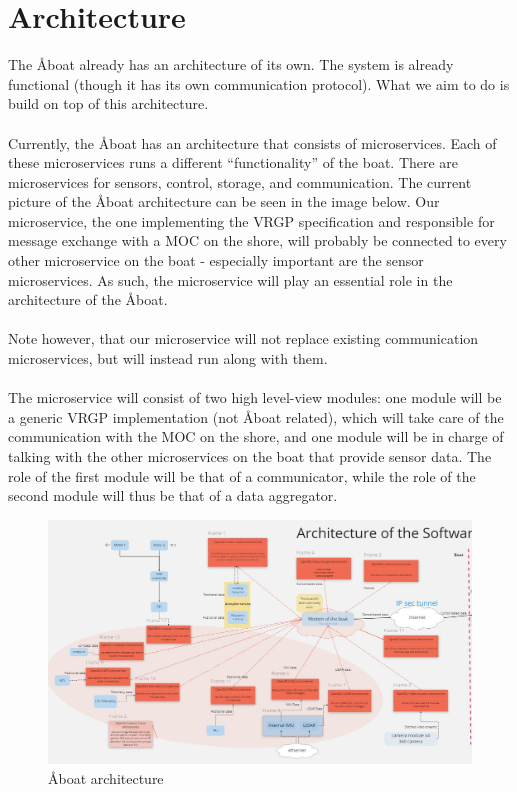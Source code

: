\section{Architecture}\label{sec:architecture}

The Åboat already has an architecture of its own. The system is already functional (though it has its own communication protocol). What we aim to do is build on top of this architecture.
\\\\
Currently, the Åboat has an architecture that consists of microservices. Each of these microservices runs a different “functionality” of the boat. There are microservices for sensors, control, storage, and communication. The current picture of the Åboat architecture can be seen in the image below. Our microservice, the one implementing the VRGP specification and responsible for message exchange with a MOC on the shore, will probably be connected to every other microservice on the boat - especially important are the sensor microservices. As such, the microservice will play an essential role in the architecture of the Åboat.
\\\\
Note however, that our microservice will not replace existing communication microservices, but will instead run along with them.
\\\\
The microservice will consist of two high level-view modules: one module will be a generic VRGP implementation (not Åboat related), which will take care of the communication with the MOC on the shore, and one module will be in charge of talking with the other microservices on the boat that provide sensor data. The role of the first module will be that of a communicator, while the role of the second module will thus be that of a data aggregator.

\begin{figure}[ht]
	\centering
	\includegraphics[width=\linewidth]{images/aboat-architecture}
	\caption{Åboat architecture}
	\label{fig:aboat-architecture}
\end{figure}

